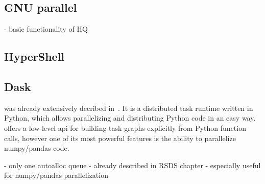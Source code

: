 \subsection*{GNU parallel}

- basic functionality of HQ


\subsection*{HyperShell}

\subsection*{Dask}

\dask{} was already extensively decribed in~. It is a distributed task
runtime written in Python, which allows parallelizing and distributing Python code in an easy
way. \dask{} offers a low-level \gls{api} for building task graphs explicitly from Python
function calls, however one of its most powerful features is the ability to parallelize
numpy/pandas code.

- only one autoalloc queue
- already described in RSDS chapter
- especially useful for numpy/pandas parallelization

